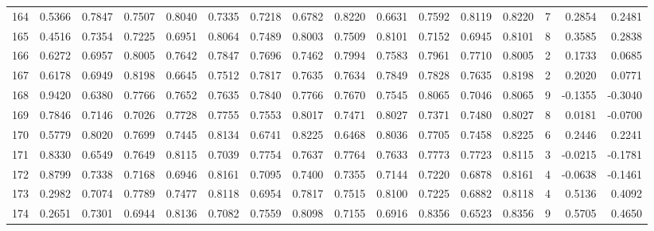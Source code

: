 \begin{tabular}{lrrrrrrrrrrrrrrr}
164 &      0.5366 &  0.7847 &  0.7507 &  0.8040 &  0.7335 &  0.7218 &  0.6782 &  0.8220 &  0.6631 &  0.7592 &   0.8119 &     0.8220 &      7 &                    0.2854 &                     0.2481 \\
165 &      0.4516 &  0.7354 &  0.7225 &  0.6951 &  0.8064 &  0.7489 &  0.8003 &  0.7509 &  0.8101 &  0.7152 &   0.6945 &     0.8101 &      8 &                    0.3585 &                     0.2838 \\
166 &      0.6272 &  0.6957 &  0.8005 &  0.7642 &  0.7847 &  0.7696 &  0.7462 &  0.7994 &  0.7583 &  0.7961 &   0.7710 &     0.8005 &      2 &                    0.1733 &                     0.0685 \\
167 &      0.6178 &  0.6949 &  0.8198 &  0.6645 &  0.7512 &  0.7817 &  0.7635 &  0.7634 &  0.7849 &  0.7828 &   0.7635 &     0.8198 &      2 &                    0.2020 &                     0.0771 \\
168 &      0.9420 &  0.6380 &  0.7766 &  0.7652 &  0.7635 &  0.7840 &  0.7766 &  0.7670 &  0.7545 &  0.8065 &   0.7046 &     0.8065 &      9 &                   -0.1355 &                    -0.3040 \\
169 &      0.7846 &  0.7146 &  0.7026 &  0.7728 &  0.7755 &  0.7553 &  0.8017 &  0.7471 &  0.8027 &  0.7371 &   0.7480 &     0.8027 &      8 &                    0.0181 &                    -0.0700 \\
170 &      0.5779 &  0.8020 &  0.7699 &  0.7445 &  0.8134 &  0.6741 &  0.8225 &  0.6468 &  0.8036 &  0.7705 &   0.7458 &     0.8225 &      6 &                    0.2446 &                     0.2241 \\
171 &      0.8330 &  0.6549 &  0.7649 &  0.8115 &  0.7039 &  0.7754 &  0.7637 &  0.7764 &  0.7633 &  0.7773 &   0.7723 &     0.8115 &      3 &                   -0.0215 &                    -0.1781 \\
172 &      0.8799 &  0.7338 &  0.7168 &  0.6946 &  0.8161 &  0.7095 &  0.7400 &  0.7355 &  0.7144 &  0.7220 &   0.6878 &     0.8161 &      4 &                   -0.0638 &                    -0.1461 \\
173 &      0.2982 &  0.7074 &  0.7789 &  0.7477 &  0.8118 &  0.6954 &  0.7817 &  0.7515 &  0.8100 &  0.7225 &   0.6882 &     0.8118 &      4 &                    0.5136 &                     0.4092 \\
174 &      0.2651 &  0.7301 &  0.6944 &  0.8136 &  0.7082 &  0.7559 &  0.8098 &  0.7155 &  0.6916 &  0.8356 &   0.6523 &     0.8356 &      9 &                    0.5705 &                     0.4650 \\

\end{tabular}
